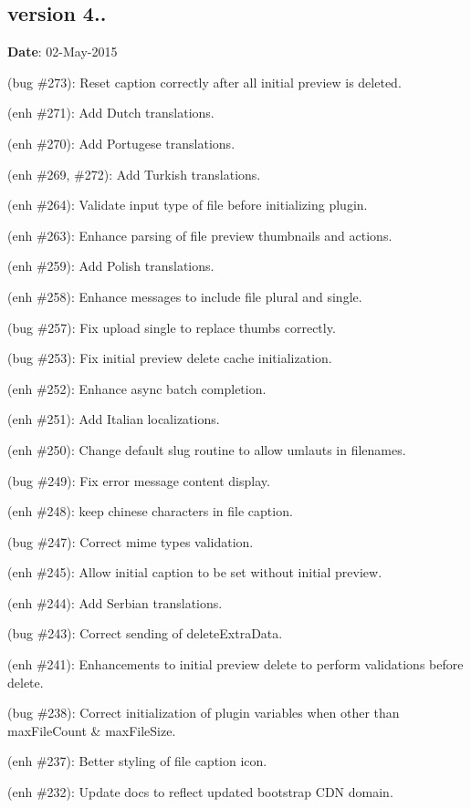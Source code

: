 \subsection*{version 4..}

{\bfseries Date}\+: 02-\/\+May-\/2015


\begin{DoxyItemize}
\item (bug \#273)\+: Reset caption correctly after all initial preview is deleted.
\item (enh \#271)\+: Add Dutch translations.
\item (enh \#270)\+: Add Portugese translations.
\item (enh \#269, \#272)\+: Add Turkish translations.
\item (enh \#264)\+: Validate input type of file before initializing plugin.
\item (enh \#263)\+: Enhance parsing of file preview thumbnails and actions.
\item (enh \#259)\+: Add Polish translations.
\item (enh \#258)\+: Enhance messages to include file plural and single.
\item (bug \#257)\+: Fix upload single to replace thumbs correctly.
\item (bug \#253)\+: Fix initial preview delete cache initialization.
\item (enh \#252)\+: Enhance async batch completion.
\item (enh \#251)\+: Add Italian localizations.
\item (enh \#250)\+: Change default slug routine to allow umlauts in filenames.
\item (bug \#249)\+: Fix error message content display.
\item (enh \#248)\+: keep chinese characters in file caption.
\item (bug \#247)\+: Correct mime types validation.
\item (enh \#245)\+: Allow initial caption to be set without initial preview.
\item (enh \#244)\+: Add Serbian translations.
\item (bug \#243)\+: Correct sending of {\ttfamily delete\+Extra\+Data}.
\item (enh \#241)\+: Enhancements to initial preview delete to perform validations before delete.
\item (bug \#238)\+: Correct initialization of plugin variables when other than max\+File\+Count \& max\+File\+Size.
\item (enh \#237)\+: Better styling of file caption icon.
\item (enh \#232)\+: Update docs to reflect updated bootstrap C\+DN domain.
\end{DoxyItemize}

